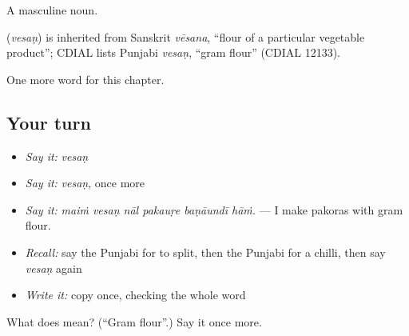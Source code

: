 A masculine noun.

\begin{cousinweb}
\textbf{} (\emph{vesaṇ}) is inherited from Sanskrit \emph{vēsana}, \textquotedblleft{}flour of a particular vegetable product\textquotedblright{}; CDIAL lists Punjabi \emph{vesaṇ}, \textquotedblleft{}gram flour\textquotedblright{} (CDIAL 12133).
\end{cousinweb}

\begin{grammarlens}[title={What you've built}]
One more word for this chapter.
\end{grammarlens}

\subsection*{Your turn}
\begin{itemize}
\raggedright
  \item \emph{Say it:} \emph{vesaṇ}
  \item \emph{Say it:} \emph{vesaṇ}, once more
  \item \emph{Say it:} \emph{maiṁ vesaṇ nāl pakauṛe baṇāundī hāṁ.} — I make pakoras with gram flour.
  \item \emph{Recall:} say the Punjabi for to split, then the Punjabi for a chilli, then say \emph{vesaṇ} again
  \item \emph{Write it:} copy \textbf{} once, checking the whole word
\end{itemize}

\begin{tcolorbox}[breakable,colback=teal!4,colframe=teal!35!black,title={Before you move on}]
What does  mean? (\textquotedblleft{}Gram flour\textquotedblright{}.) Say it once more.
\end{tcolorbox}

